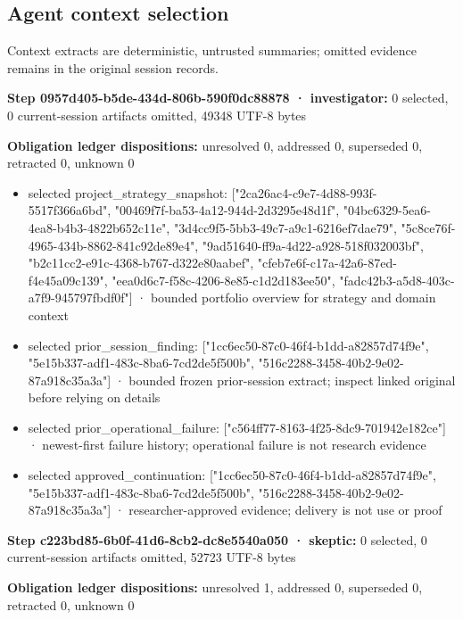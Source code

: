 \documentclass[11pt]{article}
\begin{document}
\subsection{Agent context selection}
Context extracts are deterministic, untrusted summaries; omitted evidence remains in the original session records.\par
\textbf{Step 0957d405-b5de-434d-806b-590f0dc88878 · investigator:} 0 selected, 0 current-session artifacts omitted, 49348 UTF-8 bytes\par
\textbf{Obligation ledger dispositions:} unresolved 0, addressed 0, superseded 0, retracted 0, unknown 0\par
\begin{itemize}
\item selected project\_strategy\_snapshot: ["2ca26ac4-c9e7-4d88-993f-5517f366a6bd", "00469f7f-ba53-4a12-944d-2d3295e48d1f", "04bc6329-5ea6-4ea8-b4b3-4822b652c11e", "3d4cc9f5-5bb3-49c7-a9c1-6216ef7dae79", "5c8ce76f-4965-434b-8862-841c92de89e4", "9ad51640-ff9a-4d22-a928-518f032003bf", "b2c11cc2-e91c-4368-b767-d322e80aabef", "cfeb7e6f-c17a-42a6-87ed-f4e45a09c139", "eea0d6c7-f58c-4206-8e85-c1d2d183ee50", "fadc42b3-a5d8-403c-a7f9-945797fbdf0f"] · bounded portfolio overview for strategy and domain context
\item selected prior\_session\_finding: ["1cc6ec50-87c0-46f4-b1dd-a82857d74f9e", "5e15b337-adf1-483c-8ba6-7cd2de5f500b", "516c2288-3458-40b2-9e02-87a918c35a3a"] · bounded frozen prior-session extract; inspect linked original before relying on details
\item selected prior\_operational\_failure: ["c564ff77-8163-4f25-8dc9-701942e182ce"] · newest-first failure history; operational failure is not research evidence
\item selected approved\_continuation: ["1cc6ec50-87c0-46f4-b1dd-a82857d74f9e", "5e15b337-adf1-483c-8ba6-7cd2de5f500b", "516c2288-3458-40b2-9e02-87a918c35a3a"] · researcher-approved evidence; delivery is not use or proof
\end{itemize}
\textbf{Step c223bd85-6b0f-41d6-8cb2-dc8e5540a050 · skeptic:} 0 selected, 0 current-session artifacts omitted, 52723 UTF-8 bytes\par
\textbf{Obligation ledger dispositions:} unresolved 1, addressed 0, superseded 0, retracted 0, unknown 0\par
\end{document}
